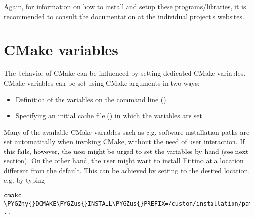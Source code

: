 \documentclass[letterpaper,10pt,english]{sphinxmanual}
\def\PYGZus{\char`\_}
\def\PYGZhy{\char`\-}
\begin{document}
Again, for information on how to install and setup these programs/libraries, it is recommended to
consult the documentation at the individual project's websites.


\section{CMake variables}
\label{troubleshooting:cmake-variables}\label{troubleshooting::doc}\label{troubleshooting:troubleshooting}
The behavior of CMake can be influenced by setting dedicated CMake variables. CMake variables can
be set using CMake arguments in two ways:
\begin{itemize}
\item {} 
Definition of the variables on the command line ()

\item {} 
Specifying an initial cache file () in which the variables are set

\end{itemize}

Many of the available CMake variables such as e.g. software installation paths are set automatically
when invoking CMake, without the need of user interaction. If this fails, however, the user might be
urged to set the variables by hand (see next section). On the other hand, the user might want to
install Fittino at a location different from the default. This can be achieved by setting
 to the desired location, e.g. by typing

\begin{Verbatim}[commandchars=\\\{\}]
cmake \PYGZhy{}DCMAKE\PYGZus{}INSTALL\PYGZus{}PREFIX=/custom/installation/path ..
\end{Verbatim}
\end{document}
